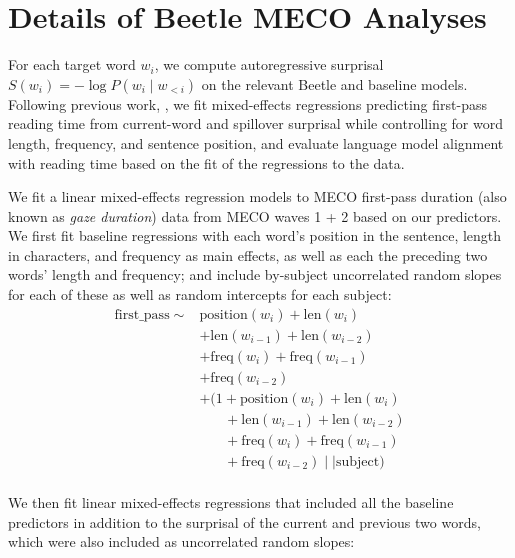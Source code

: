 \documentclass[11pt]{article}
\newcommand{\beetle}{Beetle} %
\begin{document}
\section{Details of \beetle{} MECO Analyses}\label{sec:meco-results}

For each target word $w_i$, we compute autoregressive surprisal
$S(w_i) = -\log P(w_i \mid w_{<i})$ on the relevant \beetle{} and baseline models. Following previous work,
 \citep[e.g.,][]{wilcox-etal-2023-language}, we fit mixed-effects regressions
predicting first-pass reading time from current-word and spillover
surprisal while controlling for word length,
frequency, and sentence position, and evaluate language model alignment with reading time based on the fit of the regressions to the data. 

We fit a linear mixed-effects regression models to MECO
first-pass duration (also known as \textit{gaze duration}) data from MECO waves 1 + 2 based on our predictors. We first fit baseline regressions with each word's position in the sentence, length in characters, and frequency as main effects, as well as each the preceding two words' length and frequency; and include by-subject uncorrelated random slopes for each of these as well as random intercepts for each subject:
\begin{align}
\label{eq:baseline-regression}
\mathrm{first\_pass} \sim{} &\mathrm{position}(w_i)+ \mathrm{len}(w_i)\nonumber\\&+ \mathrm{len}(w_{i-1}) + \mathrm{len}(w_{i-2})\nonumber\\
&+ \mathrm{freq}(w_i) + \mathrm{freq}(w_{i-1})\nonumber\\
& +\mathrm{freq}(w_{i-2})\nonumber\\
&+ (1 +\mathrm{position}(w_i)+ \mathrm{len}(w_i)\nonumber\\
&~~~~~~~~+ \mathrm{len}(w_{i-1}) + \mathrm{len}(w_{i-2})\nonumber\\
&~~~~~~~~+ \mathrm{freq}(w_i) + \mathrm{freq}(w_{i-1})\nonumber\\
&~~~~~~~~+ \mathrm{freq}(w_{i-2})\nonumber \mid\mid \mathrm{subject}) \\
\end{align}

We then fit linear mixed-effects regressions that included all the baseline predictors in addition to the surprisal of the current and previous two words, which were also included as uncorrelated random slopes:
\end{document}
